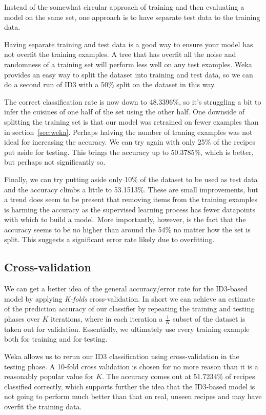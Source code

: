 \documentclass[11pt,a4paper]{article}
\begin{document}
Instead of the somewhat circular approach of training and then evaluating a model on the
same set, one approach is to have separate test data to the training data.

Having separate training and test data is a good way to ensure your model has not
overfit the training examples. A tree that has overfit all the noise and randomness of a training
set will perform less well on any test examples. \cite{tetko1995neural} Weka provides
an easy way to split the dataset into training and test data, so we can do a
second run of ID3 with a 50\% split on the dataset in this way.

The correct classification rate is now down to 48.3396\%, so it's struggling a bit to infer
the cuisines of one half of the set using the other half. One downside of splitting the
training set is that our model was retrained on fewer examples than in section~\ref{sec:weka}.
Perhaps halving the number
of traning examples was not ideal for increasing the accuracy. We can try again with only
25\% of the recipes put aside for testing. This brings the accuracy up to 50.3785\%, which
is better, but perhaps not significantly so.

Finally, we can try putting aside only 10\% of the dataset to be used as test data
and the accuracy climbs a little to 53.1513\%. These are small improvements, but a trend
does seem to be present that removing items from the training examples is harming the
accuracy as the supervised learning process has fewer datapoints with which to build a
model. More importantly, however, is the fact that the accuracy seems to be no
higher than around the 54\% no matter how the set is split. This suggests a significant
error rate likely due to overfitting.

\subsection{Cross-validation}

We can get a better idea of the general accuracy/error rate for the ID3-based model
by applying \emph{K-folds} cross-validation. In short we can achieve an estimate of
the prediction accuracy of our classifier by repeating the training and testing
phases over $K$ iterations, where in each iteration a $\frac{1}{K}$ subset of the dataset
is taken out for validation. Essentially, we ultimately use every training example
both for training and for testing.

Weka allows us to rerun our ID3 classification using cross-validation in the testing
phase. A 10-fold cross validation is chosen for no more reason than it is a reasonably
popular value for $K$. \cite{mclachlan2005analyzing} The accuracy comes out at
51.7234\% of recipes classified correctly, which supports further the idea that
the ID3-based model is not going to perform much better than that on real, unseen
recipes and may have overfit the training data.
\end{document}
